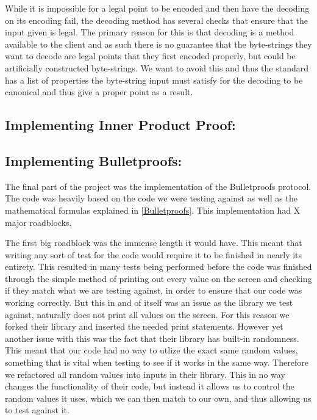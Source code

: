 \documentclass{article}
\begin{document}
While it is impossible for a legal point to be encoded and then have the decoding on its encoding fail, the decoding method has several checks that ensure that the input given is legal. The primary reason for this is that decoding is a method available to the client and as such there is no guarantee that the byte-strings they want to decode are legal points that they first encoded properly, but could be artificially constructed byte-strings. We want to avoid this and thus the standard has a list of properties the byte-string input must satisfy for the decoding to be canonical and thus give a proper point as a result. 

\subsection{Implementing Inner Product Proof:}

\subsection{Implementing Bulletproofs:}

The final part of the project was the implementation of the Bulletproofs protocol. The code was heavily based on the code we were testing against as well as the mathematical formulas explained in \ref*{Bulletproofs}. This implementation had X major roadblocks.

The first big roadblock was the immense length it would have. This meant that writing any sort of test for the code would require it to be finished in nearly its entirety. This resulted in many tests being performed before the code was finished through the simple method of printing out every value on the screen and checking if they match what we are testing against, in order to ensure that our code was working correctly. But this in and of itself was an issue as the library we test against, naturally does not print all values on the screen. For this reason we forked their library and inserted the needed print statements. However yet another issue with this was the fact that their library has built-in randomness. This meant that our code had no way to utlize the exact same random values, something that is vital when testing to see if it works in the same way. Therefore we refactored all random values into inputs in their library. This in no way changes the functionality of their code, but instead it allows us to control the random values it uses, which we can then match to our own, and thus allowing us to test against it. 
\end{document}

